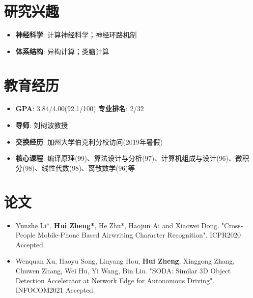 \documentclass{resume}
\begin{document}
    

\section{{\bfseries 研究兴趣}}
\begin{itemize}[parsep=0.2ex]
\item \textbf{神经科学}: 计算神经科学；神经环路机制
\item \textbf{体系结构}: 异构计算；类脑计算
\end{itemize}

\section{{\bfseries 教育经历}}
\begin{itemize}[parsep=0.1ex]
    \item \textbf{GPA}: 3.84/4.00(92.1/100)  \textbf{专业排名}: 2/32
    \item \textbf{导师}: 刘树波教授
    \item \textbf{交换经历}: 加州大学伯克利分校访问(2019年暑假)
    \item \textbf{核心课程}: 编译原理(99)、算法设计与分析(97)、计算机组成与设计(96)、微积分(98)、线性代数(98)、离散数学(96)等
\end{itemize}

\section{{\bfseries 论文}}
\begin{itemize}[parsep=0.2ex]
    \item Yunzhe Li*, \textbf{Hui Zheng*}, He Zhu*, Haojun Ai and Xiaowei Dong. "Cross-People Mobile-Phone Based Airwriting Character Recognition". ICPR2020 Accepted.
    \item Wenquan Xu, Haoyu Song, Linyang Hou, \textbf{Hui Zheng}, Xinggong Zhang, Chuwen Zhang, Wei Hu, Yi Wang, Bin Liu. "SODA: Similar 3D Object Detection Accelerator at Network Edge for Autonomous Driving". INFOCOM2021 Accepted.
\end{itemize}
\end{document}

